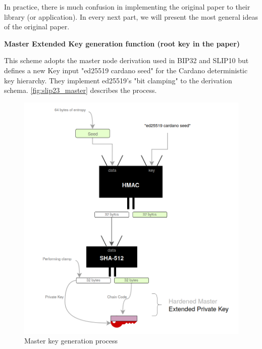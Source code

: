 In practice, there is much confusion in implementing the original paper to their library (or application). In every next part, we will present the most general ideas of the original paper.

\bigskip
{\textbf{Master Extended Key generation function (root key in the paper)}}

This scheme adopts the master node derivation used in BIP32 and SLIP10 but defines a new Key input "ed25519 cardano seed" for the Cardano deterministic key hierarchy. They implement ed25519's "bit clamping" to the derivation schema.
\autoref{fig:slip23_master} describes the process.

\begin{figure}[ht!]
    \centering
    \includegraphics[width=1\textwidth]{images/slip23_master.png}
    \caption[Master key generation process]{Master key generation process}
    \label{fig:slip23_master}
\end{figure}

